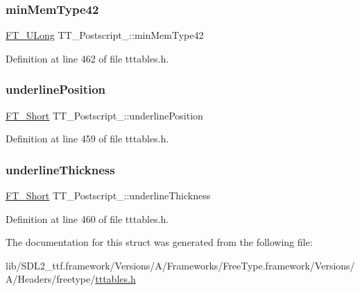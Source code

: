 \subsubsection{\texorpdfstring{minMemType42}{minMemType42}}
{\footnotesize\ttfamily \mbox{\hyperlink{fttypes_8h_a4fac88bdba78eb76b505efa6e4fbf3f5}{F\+T\+\_\+\+U\+Long}} T\+T\+\_\+\+Postscript\+\_\+\+::min\+Mem\+Type42}



Definition at line 462 of file tttables.\+h.

\mbox{\label{struct_t_t___postscript___a909fd5064ab7547bb8ed984b5dfe2fe2}} 
\subsubsection{\texorpdfstring{underlinePosition}{underlinePosition}}
{\footnotesize\ttfamily \mbox{\hyperlink{fttypes_8h_aa7279be89046a2563cd3d4d6651fbdcf}{F\+T\+\_\+\+Short}} T\+T\+\_\+\+Postscript\+\_\+\+::underline\+Position}



Definition at line 459 of file tttables.\+h.

\mbox{\label{struct_t_t___postscript___a4e4654766a4f27054c9a35958515e186}} 
\subsubsection{\texorpdfstring{underlineThickness}{underlineThickness}}
{\footnotesize\ttfamily \mbox{\hyperlink{fttypes_8h_aa7279be89046a2563cd3d4d6651fbdcf}{F\+T\+\_\+\+Short}} T\+T\+\_\+\+Postscript\+\_\+\+::underline\+Thickness}



Definition at line 460 of file tttables.\+h.



The documentation for this struct was generated from the following file\+:\begin{DoxyCompactItemize}
\item 
lib/\+S\+D\+L2\+\_\+ttf.\+framework/\+Versions/\+A/\+Frameworks/\+Free\+Type.\+framework/\+Versions/\+A/\+Headers/freetype/\mbox{\hyperlink{tttables_8h}{tttables.\+h}}\end{DoxyCompactItemize}
